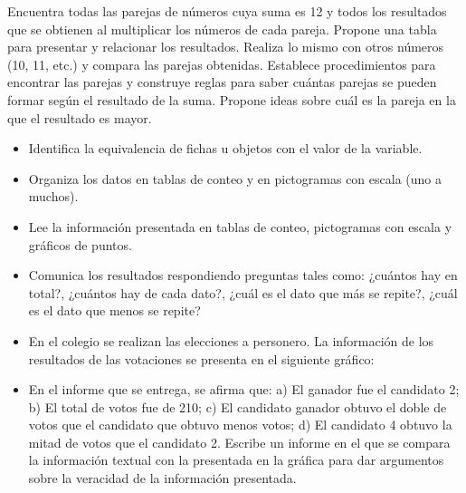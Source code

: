 \ejemplo

Encuentra todas las parejas de números cuya suma es 12 y todos los resultados que se obtienen al multiplicar los números de cada pareja. Propone una tabla para presentar y relacionar los resultados. Realiza lo mismo con otros números (10, 11, etc.) y compara las parejas obtenidas. Establece procedimientos para encontrar las parejas y construye reglas para saber cuántas parejas se pueden formar según el resultado de la suma. Propone ideas sobre cuál es la pareja en la que el resultado es mayor.



\evidencias

\begin{itemize}
  \item Identifica la equivalencia de fichas u objetos con el valor de la variable.
  \item Organiza los datos en tablas de conteo y en pictogramas con escala (uno a muchos).
  \item Lee la información presentada en tablas de conteo, pictogramas con escala y gráficos de puntos.
  \item Comunica los resultados respondiendo preguntas tales como: ¿cuántos hay en total?, ¿cuántos hay de cada dato?, ¿cuál es el dato que más se repite?, ¿cuál es el dato que menos se repite?
\end{itemize}

\ejemplo

\begin{itemize}
  \item En el colegio se realizan las elecciones a personero. La información de los resultados de las votaciones se presenta en el siguiente gráfico:
\end{itemize}


\begin{itemize}
  \item En el informe que se entrega, se afirma que: a) El ganador fue el candidato 2; b) El total de votos fue de 210; c) El candidato ganador obtuvo el doble de votos que el candidato que obtuvo menos votos; d) El candidato 4 obtuvo la mitad de votos que el candidato 2. Escribe un informe en el que se compara la información textual con la presentada en la gráfica para dar argumentos sobre la veracidad de la información presentada.
\end{itemize}

